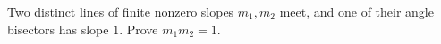 Two distinct lines of finite nonzero slopes $m_1,m_2$ meet, and one of their angle bisectors has slope $1$. Prove $m_1m_2=1$.
